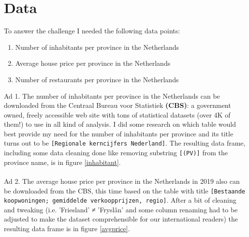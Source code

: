 \section{Data}
To answer the challenge I needed the following data points:
\medskip
\begin{enumerate}
  \item Number of inhabitants per province in the Netherlands
  \item Average house price per province in the Netherlands
  \item Number of restaurants per province in the Netherlands
\end{enumerate}
\medskip
Ad 1. The number of inhabitants per province in the Netherlands can be downloaded from the Centraal Bureau voor Statistiek \textbf{(CBS)}: a government owned, freely accessible web site with tons of statistical datasets (over 4K of them!) to use in all kind of analysis. I did some research on which table would best provide my need for the number of inhabitants per province and its title turns out to be \texttt{[Regionale kerncijfers Nederland]}. The resulting data frame, including some data cleaning done like removing substring \texttt{[(PV)]} from the province name, is in figure \ref{inhabitant}.  
\\\\
Ad 2. The average house price per province in the Netherlands in 2019 also can be downloaded from the CBS, this time based on the table with title \texttt{[Bestaande koopwoningen; gemiddelde verkoopprijzen, regio]}. After a bit of cleaning and tweaking (i.e. 'Friesland' ≠ 'Fryslân' and some column renaming had to be adjusted to make the dataset comprehensible for our international readers) the resulting data frame is in figure \ref{avgprice}.
\\\\
